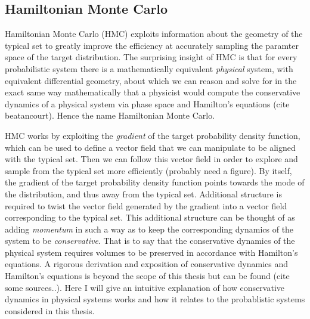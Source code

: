 \subsection{Hamiltonian Monte Carlo}
Hamiltonian Monte Carlo (HMC) exploits information about the geometry of the typical set to greatly improve the efficiency at accurately sampling the paramter space of the target distribution. The surprising insight of HMC is that for every probabilistic system there is a mathematically equivalent \textit{physical} system, with equivalent differential geometry, about which we can reason and solve for in the exact same way mathematically that a physicist would compute the conservative dynamics of a physical system via phase space and Hamilton's equations (cite beatancourt). Hence the name Hamiltonian Monte Carlo.

HMC works by exploiting the \textit{gradient} of the target probability density function, which can be used to define a vector field that we can manipulate to be aligned with the typical set. Then we can follow this vector field in order to explore and sample from the typical set more efficiently (probably need a figure). By itself, the gradient of the target probability density function points towards the mode of the distribution, and thus away from the typical set. Additional structure is required to twist the vector field generated by the gradient into a vector field corresponding to the typical set. This additional structure can be thought of as adding \textit{momentum} in such a way as to keep the corresponding dynamics of the system to be \textit{conservative}. That is to say that the conservative dynamics of the physical system requires volumes to be preserved in accordance with Hamilton's equations. A rigorous derivation and exposition of conservative dynamics and Hamilton's equations is beyond the scope of this thesis but can be found (cite some sources..). Here I will give an intuitive explanation of how conservative dynamics in physical systems works and how it relates to the probablistic systems considered in this thesis.


